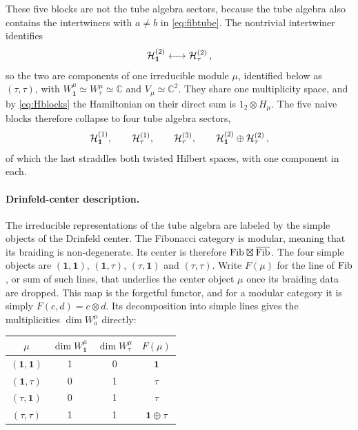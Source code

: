 \documentclass[11pt]{article}
\numberwithin{equation}{section}
\begin{document}
These five blocks are not the tube algebra sectors, because the tube algebra also contains the
intertwiners with $a \neq b$ in \eqref{eq:fibtube}. The nontrivial intertwiner identifies
\begin{equation}
  \mathcal{H}^{(2)}_{\mathbf 1} \longleftrightarrow \mathcal{H}^{(2)}_\tau \,,
  \label{eq:fibglue}
\end{equation}
so the two are components of one irreducible module $\mu$, identified below as $(\tau,\tau)$, with
$W^\mu_{\mathbf 1} \simeq W^\mu_\tau \simeq \mathbb{C}$ and $V_\mu \simeq \mathbb{C}^2$. They share one multiplicity space, and by
\eqref{eq:Hblocks} the Hamiltonian on their direct sum is $1_2 \otimes H_\mu$. The five naive blocks therefore collapse to four tube algebra sectors,
\begin{equation}
  \mathcal{H}^{(1)}_{\mathbf 1}, \qquad \mathcal{H}^{(1)}_\tau, \qquad \mathcal{H}^{(3)}_\tau, \qquad
  \mathcal{H}^{(2)}_{\mathbf 1} \oplus \mathcal{H}^{(2)}_\tau \,,
  \label{eq:fibsectors}
\end{equation}
of which the last straddles both twisted Hilbert spaces, with one component in each.

\paragraph{Drinfeld-center description.}\label{sec:fibcenter}

The irreducible representations of the tube algebra are labeled by the simple objects of the
Drinfeld center. The Fibonacci category is modular, meaning that its braiding is non-degenerate. Its center is
therefore $\mathrm{Fib} \boxtimes \overline{\mathrm{Fib}}$. The four simple objects are $(\mathbf 1,\mathbf 1)$, $(\mathbf 1,\tau)$, $(\tau,\mathbf 1)$ and
$(\tau,\tau)$. Write $F(\mu)$ for the line of $\mathrm{Fib}$, or sum of such lines, that underlies the
center object $\mu$ once its braiding data are dropped. This map is the forgetful functor, and
for a modular category it is simply $F(c,d) = c \otimes d$. Its decomposition into simple lines
gives the multiplicities $\dim W^\mu_a$ directly:

\begin{center}
\begin{tabular}{cccc}
  \toprule
  $\mu$ & $\dim W^\mu_{\mathbf 1}$ & $\dim W^\mu_\tau$ & $F(\mu)$ \\
  \midrule
  $(\mathbf 1,\mathbf 1)$       & 1 & 0 & $\mathbf 1$ \\
  $(\mathbf 1,\tau)$    & 0 & 1 & $\tau$ \\
  $(\tau,\mathbf 1)$    & 0 & 1 & $\tau$ \\
  $(\tau,\tau)$ & 1 & 1 & $\mathbf 1 \oplus \tau$ \\
  \bottomrule
\end{tabular}
\end{center}
\end{document}
